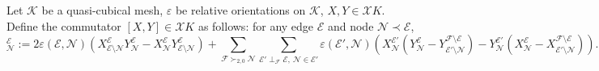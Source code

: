 \begin{definition}
  Let $\mathcal{K}$ be a quasi-cubical mesh,
    $\varepsilon$ be relative orientations on $\mathcal{K}$,
    $X, Y \in \mathcal{X} K$.
  Define the commutator $[X, Y] \in \mathcal{X} K$ as follows:
  for any edge $\mathcal{E}$ and node $\mathcal{N} \prec \mathcal{E}$,
  \begin{equation}
    [X, Y]^{\mathcal{E}}_{\mathcal{N}} :=
    2 \varepsilon(\mathcal{E}, \mathcal{N})
    (   X^{\mathcal{E}}_{\mathcal{E} \setminus \mathcal{N}}
        Y^{\mathcal{E}}_{\mathcal{N}}
      - X^{\mathcal{E}}_{\mathcal{N}}
        Y^{\mathcal{E}}_{\mathcal{E} \setminus \mathcal{N}}
    )
    +
    \sum_{\mathcal{F} \succ_{2, 0} \mathcal{N}}
      \sum_{\mathcal{E}' \perp_{\mathcal{F}} \mathcal{E},\
            \mathcal{N} \in \mathcal{E}'}
        \varepsilon(\mathcal{E}', \mathcal{N})
        ( X^{\mathcal{E}'}_{\mathcal{N}}
          (Y^{\mathcal{E}}_{\mathcal{N}}
           - Y^{\mathcal{F} \setminus \mathcal{E}}
            _{\mathcal{E}' \setminus \mathcal{N}})
          -
          Y^{\mathcal{E}'}_{\mathcal{N}}
          (X^{\mathcal{E}}_{\mathcal{N}}
           - X^{\mathcal{F} \setminus \mathcal{E}}
            _{\mathcal{E}' \setminus \mathcal{N}})
        ).
  \end{equation}
\end{definition}
